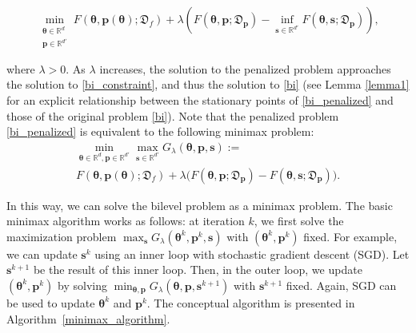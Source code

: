 \begin{equation}\label{bi_penalized}
  \min_{\substack{\bm{\theta} \in \mathbb{R}^d \\ \bm{\mathbf{p}} \in \mathbb{R}^{d'}}} \!\! F({ \bm{\theta}}, { \mathbf{p}(\bm{\theta})};\mathfrak{D}_f) + \lambda(F({ \bm{\theta}}, { \mathbf{p}};\mathfrak{D}_{ \mathbf{p}}) - \!\!
  \inf_{{ \mathbf{s}}\in\mathbb{R}^{d'}} F({ \bm{\theta}}, { \mathbf{{ \mathbf{s}}}};\mathfrak{D}_{ \mathbf{p}})),
\end{equation}

where $\lambda>0$. As $\lambda$ increases, the solution to the penalized problem approaches the solution to \eqref{bi_constraint}, and thus the solution to \eqref{bi} (see Lemma \ref{lemma1} for an explicit relationship between the stationary points of \eqref{bi_penalized} and those of the original problem \eqref{bi}).
 Note that the penalized problem \eqref{bi_penalized} is equivalent to the following minimax problem:
\begin{multline}
\label{equation5}
\min_{{ \bm{\theta}}\in \mathbb{R}^d,{ \mathbf{p}}\in\mathbb{R}^{d'}} 
\max_{{ \mathbf{s}}\in\mathbb{R}^{d'}} 
G_\lambda({ \bm{\theta}},{ \mathbf{p}},{ \mathbf{s}}):= \\
F({ \bm{\theta}}, { \mathbf{p}(\bm{\theta})};\mathfrak{D}_f)
+ \lambda \big( F({ \bm{\theta}}, { \mathbf{p}};\mathfrak{D}_{ \mathbf{p}})
- F({ \bm{\theta}}, { \mathbf{s}};\mathfrak{D}_{ \mathbf{p}}) \big).
\end{multline}

In this way, we can solve the bilevel problem as a minimax problem. The basic minimax algorithm works as follows: at iteration $k$, we first solve the maximization problem $\max_{ \mathbf{{ \mathbf{s}}}}G_\lambda({ \bm{\theta}}^k, { \mathbf{p}}^k, { \mathbf{s}})$ with $({ \bm{\theta}}^k, { \mathbf{p}}^k)$ fixed. For example, we can update ${ \mathbf{s}}^k$ using an inner loop with stochastic gradient descent (SGD). Let ${ \mathbf{s}}^{k+1}$ be the result of this inner loop. Then, in the outer loop, we update $({ \bm{\theta}}^k, { \mathbf{p}}^k)$ by solving $\min_{{ \bm{\theta}}, { \mathbf{p}}} G_\lambda({ \bm{\theta}}, { \mathbf{p}}, { \mathbf{s}}^{k+1})$ with ${ \mathbf{s}}^{k+1}$ fixed. Again, SGD can be used to update ${ \bm{\theta}}^k$ and ${ \mathbf{p}}^k$. The conceptual algorithm is presented in Algorithm~\ref{minimax_algorithm}.

